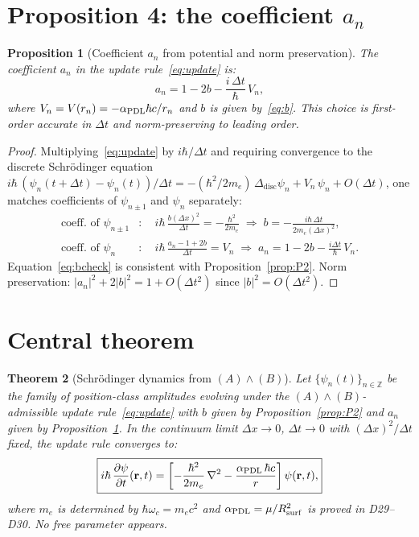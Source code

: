 \documentclass[11pt,a4paper]{article}
\newtheorem{theorem}{Theorem}[section]
\newtheorem{proposition}[theorem]{Proposition}
\theoremstyle{definition}
\newcommand{\PDL}{\textnormal{PDL}}
\newcommand{\Rsurf}{R_{\mathrm{surf}}}
\newcommand{\hb}{\hbar}
\newcommand{\aPDL}{\alpha_{\PDL}}
\begin{document}
\section{Proposition 4: the coefficient \texorpdfstring{$a_n$}{an}}
\label{sec:P4}

\begin{proposition}[Coefficient $a_n$ from potential and norm preservation]
\label{prop:P4}
The coefficient $a_n$ in the update rule~\eqref{eq:update} is:
\begin{equation}
a_n = 1 - 2b - \frac{i\,\Delta t}{\hb}\,V_n,
\label{eq:a}
\end{equation}
where $V_n = V(r_n) = -\aPDL\hb c/r_n$ and $b$ is given by~\eqref{eq:b}. This choice is first-order accurate in $\Delta t$ and norm-preserving to leading order.
\end{proposition}

\begin{proof}
Multiplying~\eqref{eq:update} by $i\hb/\Delta t$ and requiring convergence to the discrete Schr\"odinger equation $i\hb\,(\psi_n(t+\Delta t)-\psi_n(t))/\Delta t = -(\hb^2/2m_e)\,\Delta_{\mathrm{disc}}\psi_n + V_n\,\psi_n + O(\Delta t)$, one matches coefficients of $\psi_{n\pm 1}$ and $\psi_n$ separately:
\begin{align}
\text{coeff.\ of }\psi_{n\pm1} &:\quad i\hb\,\frac{b(\Delta x)^2}{\Delta t} = -\frac{\hb^2}{2m_e} \;\Rightarrow\; b = -\frac{i\hb\,\Delta t}{2m_e(\Delta x)^2}, \label{eq:bcheck} \\
\text{coeff.\ of }\psi_n &:\quad i\hb\,\frac{a_n-1+2b}{\Delta t} = V_n \;\Rightarrow\; a_n = 1 - 2b - \frac{i\Delta t}{\hb}\,V_n. \label{eq:asolve}
\end{align}
Equation~\eqref{eq:bcheck} is consistent with Proposition~\ref{prop:P2}. Norm preservation: $|a_n|^2 + 2|b|^2 = 1 + O(\Delta t^2)$ since $|b|^2 = O(\Delta t^2)$.
\end{proof}

\section{Central theorem}
\label{sec:theorem}

\begin{theorem}[Schr\"odinger dynamics from $(A)\wedge(B)$]
\label{thm:main}
Let $\{\psi_n(t)\}_{n\in\mathbb{Z}}$ be the family of position-class amplitudes evolving under the $(A)\wedge(B)$-admissible update rule~\eqref{eq:update} with $b$ given by Proposition~\ref{prop:P2} and $a_n$ given by Proposition~\ref{prop:P4}. In the continuum limit $\Delta x\to 0$, $\Delta t\to 0$ with $(\Delta x)^2/\Delta t$ fixed, the update rule converges to:
\begin{equation}
\boxed{i\hb\,\frac{\partial\psi}{\partial t}(\mathbf{r},t) = \left[-\frac{\hb^2}{2m_e}\,\nabla^2 - \frac{\aPDL\,\hb c}{r}\right]\psi(\mathbf{r},t),}
\label{eq:Schrodinger}
\end{equation}
where $m_e$ is determined by $\hb\omega_c = m_e c^2$ and $\aPDL = \mu/\Rsurf^2$ is proved in D29--D30. No free parameter appears.
\end{theorem}
\end{document}
